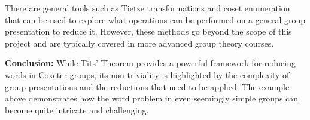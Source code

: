 \documentclass[../main.tex]{subfiles}
\begin{document}
There are general tools such as Tietze transformations and coset enumeration that can be used to explore what operations can be performed on a general group presentation to reduce it. However, these methods go beyond the scope of this project and are typically covered in more advanced group theory courses.

\vspace{\baselineskip}
\noindent \textbf{Conclusion:} While Tits' Theorem provides a powerful framework for reducing words in Coxeter groups, its non-triviality is highlighted by the complexity of group presentations and the reductions that need to be applied. The example above demonstrates how the word problem in even seemingly simple groups can become quite intricate and challenging.
\end{document}
